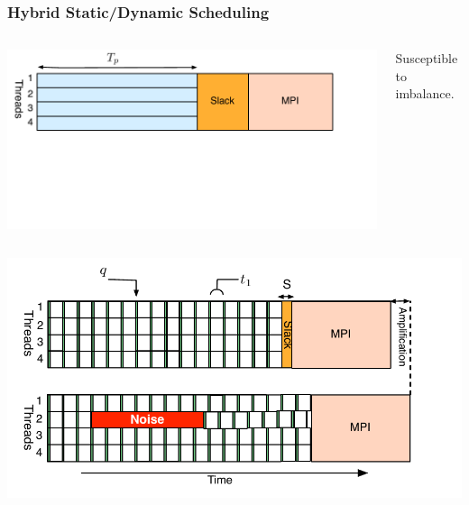 {\begin{frame}[label=hybridstatdyn]
 \frametitle{Hybrid Static/Dynamic Scheduling}
\begin{columns}
  \vspace*{-0.2in}
  
  \vspace*{-0.2in}
  \begin{center}
    \includegraphics[scale=0.31]{./images/threadedCompRegion-static}
  \end{center}
  \vspace*{-0.4in}
  \begin{center}
    \tiny Susceptible to imbalance.
  \end{center}
\end{columns}
\begin{columns}
\vspace*{-0.15in}

  \begin{center}
    \includegraphics[scale=0.31]{./images/threadedCompRegion-dynamic}

\end{center}
\end{columns}
\end{frame}}
